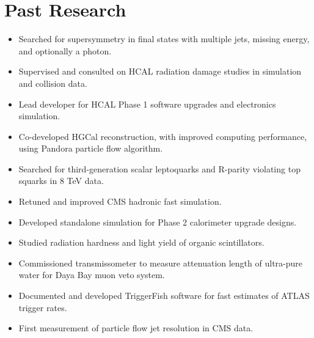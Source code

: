 \section{Past Research}
\begin{itemize}[leftmargin=12pt]
\item Searched for supersymmetry in final states with multiple jets, missing energy, and optionally a photon.
\item Supervised and consulted on HCAL radiation damage studies in simulation and collision data.
\item Lead developer for HCAL Phase 1 software upgrades and electronics simulation.
\item Co-developed HGCal reconstruction, with improved computing performance, using Pandora particle flow algorithm.
\item Searched for third-generation scalar leptoquarks and R-parity violating top squarks in 8 TeV data.
\item Retuned and improved CMS hadronic fast simulation.
\item Developed standalone simulation for Phase 2 calorimeter upgrade designs.
\item Studied radiation hardness and light yield of organic scintillators.
\item Commissioned transmissometer to measure attenuation length of ultra-pure water for Daya Bay muon veto system.
\item Documented and developed TriggerFish software for fast estimates of ATLAS trigger rates.
\item First measurement of particle flow jet resolution in CMS data.
\end{itemize}
